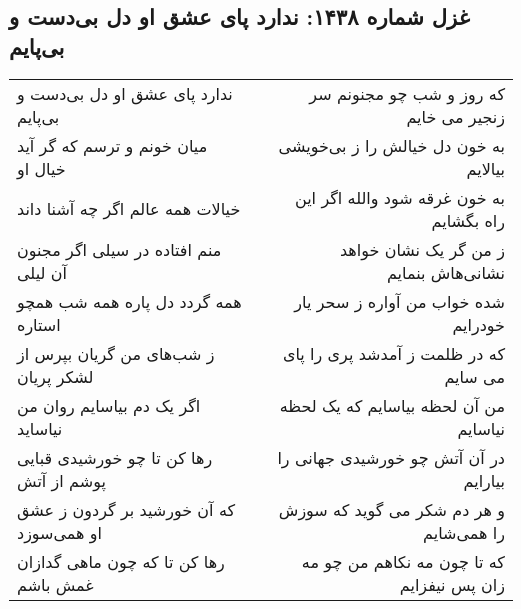 \begin{center}
\section*{غزل شماره ۱۴۳۸: ندارد پای عشق او دل بی‌دست و بی‌پایم}
\label{sec:1438}
\begin{longtable}{l p{0.5cm} r}
ندارد پای عشق او دل بی‌دست و بی‌پایم
&&
که روز و شب چو مجنونم سر زنجیر می خایم
\\
میان خونم و ترسم که گر آید خیال او
&&
به خون دل خیالش را ز بی‌خویشی بیالایم
\\
خیالات همه عالم اگر چه آشنا داند
&&
به خون غرقه شود والله اگر این راه بگشایم
\\
منم افتاده در سیلی اگر مجنون آن لیلی
&&
ز من گر یک نشان خواهد نشانی‌هاش بنمایم
\\
همه گردد دل پاره همه شب همچو استاره
&&
شده خواب من آواره ز سحر یار خودرایم
\\
ز شب‌های من گریان بپرس از لشکر پریان
&&
که در ظلمت ز آمدشد پری را پای می سایم
\\
اگر یک دم بیاسایم روان من نیاساید
&&
من آن لحظه بیاسایم که یک لحظه نیاسایم
\\
رها کن تا چو خورشیدی قبایی پوشم از آتش
&&
در آن آتش چو خورشیدی جهانی را بیارایم
\\
که آن خورشید بر گردون ز عشق او همی‌سوزد
&&
و هر دم شکر می گوید که سوزش را همی‌شایم
\\
رها کن تا که چون ماهی گدازان غمش باشم
&&
که تا چون مه نکاهم من چو مه زان پس نیفزایم
\\
\end{longtable}
\end{center}
